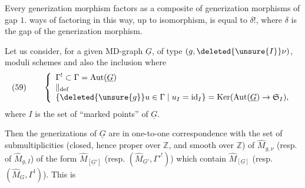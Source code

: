 Every generization morphism factors as a composite of generization morphisms of gap $1$.   ways of factoring in this way, up to isomorphism, is equal to $\delta!$, where $\delta$ is the gap of the generization morphism.

Let us consider, for a given MD-graph $\underline{G}$, of  type $(g,\deleted{\unsure{I}}\nu)$,   moduli schemes 
and also the inclusion
where
\[
\text{(59)}\qquad
\left\{\begin{array}{l}
\Gamma^!\subset\Gamma=\operatorname{Aut}(\underline G)\\
\Vert_{\mathrm{def}}\\
\{\deleted{\unsure{g}}u\in\Gamma\mid u_I=\operatorname{id}_I\}=\operatorname{Ker}(\operatorname{Aut}(\underline G)\to\mathfrak S_I),
\end{array}\right.
\]
where $I$ is the set of ``marked points'' of $\underline G$.

Then the  generizations of $\underline G$ are in one-to-one correspondence with the set of submultiplicities (closed,  hence proper over $\mathbb Z$, and smooth over $\mathbb Z$) of $\widehat M_{g,\nu}$ (resp. of $\widehat M_{g,I}$) of the form $\widehat M_{[\underline G']}$ (resp. $(\widehat M_{\underline G'},\Gamma'^!)$) which contain $\widehat M_{[\underline G]}$ (resp. $(\widehat M_G,\Gamma^!)$). This is
